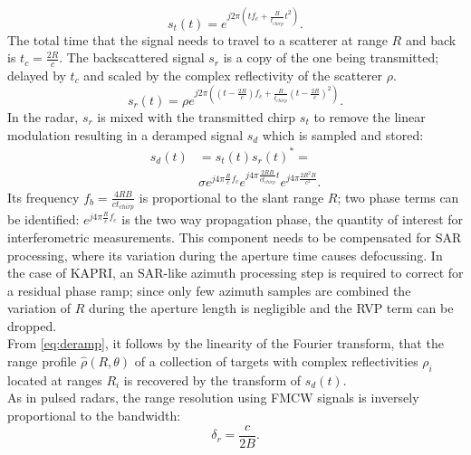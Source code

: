 \begin{equation}
	s_t\left(t\right) = e^{j 2 \pi \left( t f_{c} +  \frac{B}{t_{chirp}} t^2 \right)}.
\end{equation}
The total time that the signal needs to travel to a scatterer at range $R$ and back is $t_{c} = \frac{2 R}{c}$. The backscattered signal $s_r$ is a copy of the one being transmitted; delayed by $t_{c}$ and scaled by the complex reflectivity of the scatterer $\rho$.
\begin{equation}
		s_r\left(t\right) = \rho e^{j 2 \pi \left( \left(t - \frac{2 R}{c}\right) f_{c} +  \frac{B}{t_{chirp}} \left(t - \frac{2 R}{c}\right)^2 \right)}.
\end{equation}
In the radar, $s_r$ is mixed with the transmitted chirp $s_t$  to remove the linear modulation resulting in a deramped signal $s_d$ which is sampled and stored: 
\begin{equation}\label{eq:deramp}
	\begin{aligned}
	s_{d}\left(t\right) &=s_t\left(t\right)s_r\left(t\right)^* =\\ 
	&\sigma e^{j 4 \pi \frac{ R}{c}f_c}  e^{j 4 \pi \frac{2 R B }{c t_{chirp}} t}  e^{j 4 \pi \frac{2 R^2 B}{c^2}}.
	\end{aligned}
\end{equation} 
Its frequency $f_{b} = \frac{4 R B}{c t_{chirp}}$ is proportional to the slant range $R$;
two phase terms can be identified: $ e^{j 4 \pi \frac{R}{c}f_c}$ is the two way propagation phase, the quantity of interest for  interferometric measurements. This component needs to be compensated for SAR processing, where its variation during the aperture time causes defocussing. In the case of KAPRI, an SAR-like azimuth processing step is required to correct for a residual phase ramp; since only few azimuth samples are combined the variation of $R$ during the aperture length is negligible and the RVP term can be dropped.\\
From \autoref{eq:deramp}, it follows by the linearity of the Fourier transform, that the range profile $\hat{\rho}\left(R, \theta\right)$ of a collection of targets with complex reflectivities $\rho_i$ located at ranges $R_{i}$ is recovered by the transform of $s_{d}\left(t\right)$.\\
As in pulsed radars, the range resolution using FMCW signals is inversely proportional to the bandwidth:
\begin{equation}\label{eq:range_resolution_theoretical}
	\delta_{r} = \frac{c}{2 B}.
\end{equation}
